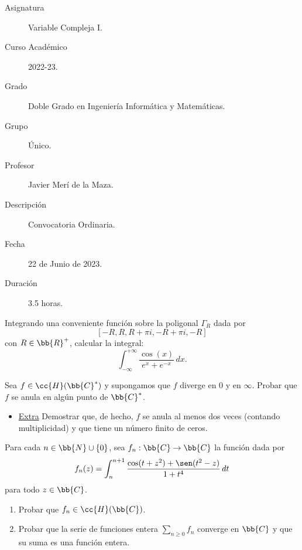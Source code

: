 \documentclass[12pt]{article}
\begin{document}

    
    

    \begin{description}
        \item[Asignatura] Variable Compleja I.
        \item[Curso Académico] 2022-23.
        \item[Grado] Doble Grado en Ingeniería Informática y Matemáticas.
        \item[Grupo] Único.
        \item[Profesor] Javier Merí de la Maza.
        \item[Descripción] Convocatoria Ordinaria.
        \item[Fecha] 22 de Junio de 2023.
        \item[Duración] 3.5 horas.
    \end{description}
    \newpage

    \begin{ejercicio}[2.5 puntos]
        Integrando una conveniente función sobre la poligonal $\Gamma_R$ dada por
        $$[-R, R, R + \pi i, -R + \pi i, -R]$$
        con $R \in \bb{R}^+$, calcular la integral:
        \begin{equation*}
            \int_{-\infty}^{+\infty} \frac{\cos(x)}{e^x + e^{-x}} \, dx.
        \end{equation*}
    \end{ejercicio}

    \begin{ejercicio}[2.5 + 1.5 puntos]
        Sea $f \in \cc{H}(\bb{C}^*)$ y supongamos que $f$ diverge en $0$ y en $\infty$.
        Probar que $f$ se anula en algún punto de $\bb{C}^*$.
        \begin{itemize}
            \item \ul{Extra} Demostrar que, de hecho, $f$ se anula al menos dos veces (contando multiplicidad) y que tiene un número finito de ceros. 
        \end{itemize}
    \end{ejercicio}

    \begin{ejercicio}[2.5 puntos]
        Para cada $n \in \bb{N} \cup \{0\}$, sea $f_n : \bb{C} \to \bb{C}$ la función dada por
        $$f_n(z) = \int_n^{n+1} \frac{\cos(t + z^2) + \sen(t^2 - z)}{1 + t^4} \, dt$$
        para todo $z \in \bb{C}$.
        \begin{enumerate}
            \item Probar que $f_n \in \cc{H}(\bb{C})$.
            \item Probar que la serie de funciones entera $\sum\limits_{n\geq 0} f_n$ converge en $\bb{C}$ y que su suma es una función entera.
        \end{enumerate}
    \end{ejercicio}
\end{document}
